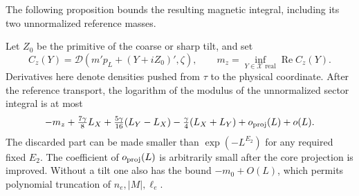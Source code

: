 The following proposition bounds the resulting magnetic integral,
including its two unnormalized reference masses.

\begin{proposition}\label{prop:07_magnetic_analysis-transport}
Let \(Z_0\) be the primitive of the coarse or sharp tilt, and set
\[
 C_z(Y)=\mathcal D(m'p_L+(Y+iZ_0)',\zeta),\qquad
 m_z=\inf_{Y\in\mathcal X\text{ real}}\operatorname{Re}C_z(Y).
\]
Derivatives here denote densities pushed from \(\tau\) to the physical
coordinate. After the reference transport, the logarithm of the modulus
of the unnormalized sector integral is at most
\[
 -m_z+\tfrac{7\gamma}{8}L_X+\tfrac{5\gamma}{16}(L_Y-L_X)
       -\tfrac{\gamma}{4}(L_X+L_Y)+o_{\rm proj}(L)+o(L).
\]
The discarded part can be made smaller than
\(\exp(-L^{E_2})\) for any required fixed \(E_2\). The coefficient of
\(o_{\rm proj}(L)\) is arbitrarily small after the core projection is
improved. Without a tilt one also has the bound \(-m_0+O(L)\),
which permits polynomial truncation of \(n_e,|M|,\ell_e\).
\end{proposition}
